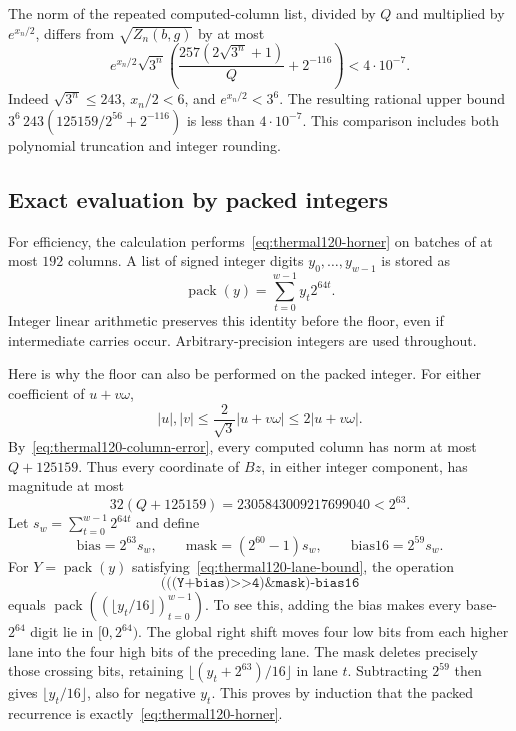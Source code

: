 The norm of the repeated computed-column list, divided by $Q$ and
multiplied by $e^{x_n/2}$, differs from $\sqrt{Z_n(b,g)}$ by at most
\begin{equation}\label{eq:thermal120-scaled-error}
 e^{x_n/2}\sqrt{3^n}
 \left(\frac{257(2\sqrt{3^n}+1)}Q+2^{-116}\right)
 <4\cdot10^{-7}.
\end{equation}
Indeed $\sqrt{3^n}\le243$, $x_n/2<6$, and $e^{x_n/2}<3^6$.
The resulting rational upper bound
$3^6\,243(125159/2^{56}+2^{-116})$ is less than $4\cdot10^{-7}$.
This comparison includes both polynomial truncation and integer rounding.

\subsection{Exact evaluation by packed integers}

For efficiency, the calculation performs~\eqref{eq:thermal120-horner}
on batches of at most $192$ columns.  A list of signed integer digits
$y_0,\ldots,y_{w-1}$ is stored as
\[
 \operatorname{pack}(y)=\sum_{t=0}^{w-1}y_t2^{64t}.
\]
Integer linear arithmetic preserves this identity before the floor,
even if intermediate carries occur.  Arbitrary-precision integers are
used throughout.

Here is why the floor can also be performed on the packed integer.
For either coefficient of $u+v\omega$,
\[
 |u|,|v|\le\frac2{\sqrt3}|u+v\omega|\le2|u+v\omega|.
\]
By~\eqref{eq:thermal120-column-error}, every computed column has norm
at most $Q+125159$.  Thus every coordinate of $Bz$, in either integer
component, has magnitude at most
\begin{equation}\label{eq:thermal120-lane-bound}
 32(Q+125159)=2305843009217699040<2^{63}.
\end{equation}
Let $s_w=\sum_{t=0}^{w-1}2^{64t}$ and define
\[
 \mathrm{bias}=2^{63}s_w,\qquad
 \mathrm{mask}=(2^{60}-1)s_w,\qquad
 \mathrm{bias16}=2^{59}s_w.
\]
For $Y=\operatorname{pack}(y)$ satisfying~\eqref{eq:thermal120-lane-bound},
the operation
\[
 \texttt{(((Y+bias)>{}>4)\&mask)-bias16}
\]
equals $\operatorname{pack}((\lfloor y_t/16\rfloor)_{t=0}^{w-1})$.
To see this, adding the bias makes every base-$2^{64}$ digit lie in
$[0,2^{64})$.  The global right shift moves four low bits from each
higher lane into the four high bits of the preceding lane.  The mask
deletes precisely those crossing bits, retaining
$\lfloor(y_t+2^{63})/16\rfloor$ in lane $t$.
Subtracting $2^{59}$ then gives $\lfloor y_t/16\rfloor$, also for
negative $y_t$.  This proves by induction that the packed recurrence
is exactly~\eqref{eq:thermal120-horner}.


